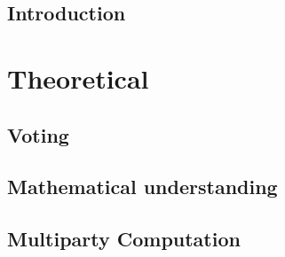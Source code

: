 \documentclass[a4paper]{report}
\theoremstyle{plain}
\begin{document}
\chapter{Introduction}
    
    
    
    
    
    
    
    
    

\part{Theoretical}
 \clearpage
\chapter{Voting}    
    


\clearpage
\chapter{Mathematical understanding}
    
    
    
    
    
    
    
    
    

\clearpage
\chapter{Multiparty Computation}
    
    
    
    
    
    
 \clearpage
\end{document}
